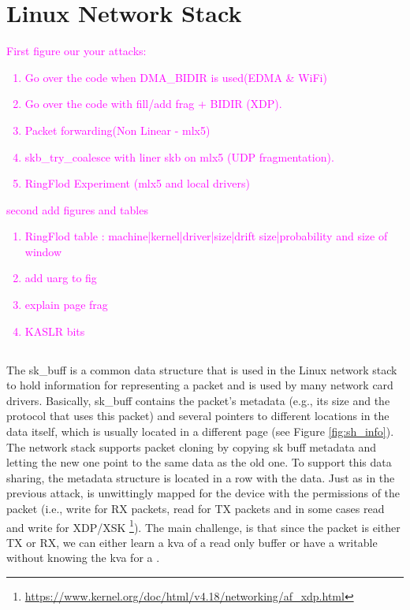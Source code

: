\section{Linux Network Stack}
\textcolor{magenta}{First figure our your attacks:\begin{enumerate}
    \item Go over the code when DMA\_BIDIR is used(EDMA \& WiFi)
    \item Go over the code with fill/add frag + BIDIR (XDP).
    \item Packet forwarding(Non Linear - mlx5)
    \item skb\_try\_coalesce with liner skb on mlx5 (UDP fragmentation).
    \item RingFlod Experiment (mlx5 and local drivers)
\end{enumerate}
second add figures and tables
\begin{enumerate}
    \item RingFlod table : machine|kernel|driver|size|drift size|probability and size of window
    \item add uarg to \shinfo fig
    \item explain page frag
    \item KASLR bits
\end{enumerate}}
\subsection{\shinfo}
The sk\_buff is a common data structure that is used in the Linux network stack to hold information for representing a packet and is used by many network card drivers. Basically, sk\_buff contains the packet’s metadata (e.g., its size and the protocol that uses this packet) and several pointers to different locations in the data itself, which is usually located in a different page (see Figure \ref{fig:sh_info}). The network stack supports packet cloning by copying sk buff metadata and letting the new one point to the same data as the old one. To support this data sharing, the \shinfo metadata structure is located in a row with the data. Just as in the previous attack, \shinfo is unwittingly mapped for the device with the permissions of the packet (i.e., write for RX packets, read for TX packets and in some cases read and write for XDP/XSK \footnote{\url{https://www.kernel.org/doc/html/v4.18/networking/af_xdp.html}}). The main challenge, is that since the packet is either TX or RX, we can either learn a kva of a read only buffer or have a writable \shinfo without knowing the kva for a \mabaf.


